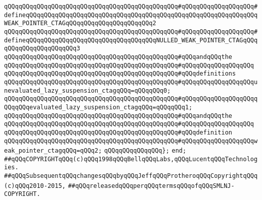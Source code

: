 \verb|qQQqqQQqqQQqqQQqqQQqqQQqqQQqqQQqqQQqqQQqqQQqqQQq#qQQqqQQqqQQqqQQqqQQq#defineqQQqqQQqqQQqqQQqqQQqqQQqqQQqqQQqqQQqqQQqqQQqqQQqqQQqqQQqqQQqqQQqWEAK_POINTER_CTAGqQQqqQQqqQQqqQQqqQQqqQQq2|\newline
\verb|qQQqqQQqqQQqqQQqqQQqqQQqqQQqqQQqqQQqqQQqqQQqqQQq#qQQqqQQqqQQqqQQqqQQq#defineqQQqqQQqqQQqqQQqqQQqqQQqqQQqqQQqqQQqNULLED_WEAK_POINTER_CTAGqQQqqQQqqQQqqQQqqQQqqQQq3|\newline
\verb|qQQqqQQqqQQqqQQqqQQqqQQqqQQqqQQqqQQqqQQqqQQqqQQq#qQQqandqQQqthe|\newline
\verb|qQQqqQQqqQQqqQQqqQQqqQQqqQQqqQQqqQQqqQQqqQQqqQQq#qQQqqQQqqQQqqQQqqQQq|\newline
\verb|qQQqqQQqqQQqqQQqqQQqqQQqqQQqqQQqqQQqqQQqqQQqqQQq#qQQqdefinitions|\newline
\verb|qQQqqQQqqQQqqQQqqQQqqQQqqQQqqQQqqQQqqQQqqQQqqQQq#qQQqqQQqqQQqqQQqqQQqunevaluated_lazy_suspension_ctagqQQq=qQQqqQQq0;|\newline
\verb|qQQqqQQqqQQqqQQqqQQqqQQqqQQqqQQqqQQqqQQqqQQqqQQq#qQQqqQQqqQQqqQQqqQQqqQQqqQQqevaluated_lazy_suspension_ctagqQQq=qQQqqQQq1;|\newline
\verb|qQQqqQQqqQQqqQQqqQQqqQQqqQQqqQQqqQQqqQQqqQQqqQQq#qQQqandqQQqthe|\newline
\verb|qQQqqQQqqQQqqQQqqQQqqQQqqQQqqQQqqQQqqQQqqQQqqQQq#qQQqqQQqqQQqqQQqqQQq|\newline
\verb|qQQqqQQqqQQqqQQqqQQqqQQqqQQqqQQqqQQqqQQqqQQqqQQq#qQQqdefinition|\newline
\verb|qQQqqQQqqQQqqQQqqQQqqQQqqQQqqQQqqQQqqQQqqQQqqQQq#qQQqqQQqqQQqqQQqqQQqweak_pointer_ctagqQQq=qQQq2;|\newline
\verb|qQQqqQQqqQQqqQQq};|\newline
\verb|end;|\newline
\newline
\newline
\newline
\verb|##qQQqCOPYRIGHTqQQq(c)qQQq1998qQQqBellqQQqLabs,qQQqLucentqQQqTechnologies.|\newline
\verb|##qQQqSubsequentqQQqchangesqQQqbyqQQqJeffqQQqProtheroqQQqCopyrightqQQq(c)qQQq2010-2015,|\newline
\verb|##qQQqreleasedqQQqperqQQqtermsqQQqofqQQqSMLNJ-COPYRIGHT.|\newline

